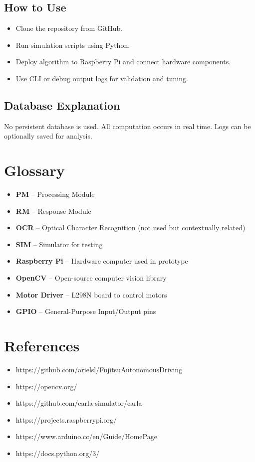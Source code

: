 \documentclass[12pt]{article}
\begin{document}
\subsection{How to Use}
\begin{itemize}
  \item Clone the repository from GitHub.
  \item Run simulation scripts using Python.
  \item Deploy algorithm to Raspberry Pi and connect hardware components.
  \item Use CLI or debug output logs for validation and tuning.
\end{itemize}

\subsection{Database Explanation}
No persistent database is used. All computation occurs in real time. Logs can be optionally saved for analysis.

\section{Glossary}
\begin{itemize}[leftmargin=*]
  \item \textbf{PM} – Processing Module
  \item \textbf{RM} – Response Module
  \item \textbf{OCR} – Optical Character Recognition (not used but contextually related)
  \item \textbf{SIM} – Simulator for testing
  \item \textbf{Raspberry Pi} – Hardware computer used in prototype
  \item \textbf{OpenCV} – Open-source computer vision library
  \item \textbf{Motor Driver} – L298N board to control motors
  \item \textbf{GPIO} – General-Purpose Input/Output pins
\end{itemize}

\section{References}
\begin{itemize}
  \item https://github.com/arielsl/FujitsuAutonomousDriving
  \item https://opencv.org/
  \item https://github.com/carla-simulator/carla
  \item https://projects.raspberrypi.org/
  \item https://www.arduino.cc/en/Guide/HomePage
  \item https://docs.python.org/3/
\end{itemize}
\end{document}

